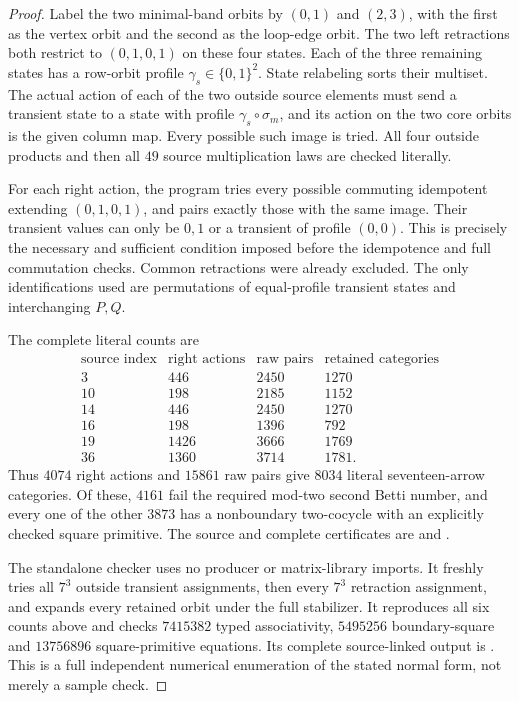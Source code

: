 \begin{proof}
Label the two minimal-band orbits by $(0,1)$ and $(2,3)$,
with the first as the vertex orbit and the second as the
loop-edge orbit.  The two left retractions both restrict
to $(0,1,0,1)$ on these four states.
Each of the three remaining states has a row-orbit
profile $\gamma_s\in\{0,1\}^2$.  State relabeling sorts
their multiset.  The actual action of each of the two
outside source elements must send a transient state to
a state with profile $\gamma_s\circ\sigma_m$, and its
action on the two core orbits is the given column map.
Every possible such image is tried.  All four outside
products and then all $49$ source multiplication laws
are checked literally.

For each right action, the program tries every possible
commuting idempotent extending $(0,1,0,1)$, and pairs
exactly those with the same image.  Their transient
values can only be $0,1$ or a transient of profile
$(0,0)$.  This is precisely the necessary and sufficient
condition imposed before the idempotence and full
commutation checks.  Common retractions were already
excluded.  The only identifications used are permutations
of equal-profile transient states and interchanging
$P,Q$.

The complete literal counts are
\[
\begin{array}{c|r|r|r}
\text{source index}&\text{right actions}&
   \text{raw pairs}&\text{retained categories}\\\hline
3&446&2450&1270\\
10&198&2185&1152\\
14&446&2450&1270\\
16&198&1396&792\\
19&1426&3666&1769\\
36&1360&3714&1781.
\end{array}
\]
Thus $4074$ right actions and $15861$ raw pairs give
$8034$ literal seventeen-arrow categories.  Of these,
$4161$ fail the required mod-two second Betti number,
and every one of the other $3873$ has a nonboundary
two-cocycle with an explicitly checked square primitive.
The source and complete certificates are
 and
.

The standalone checker
uses no producer or matrix-library imports.  It freshly
tries all $7^3$ outside transient assignments, then every
$7^3$ retraction assignment, and expands every retained
orbit under the full stabilizer.  It reproduces all
six counts above and checks $7415382$ typed associativity,
$5495256$ boundary-square and $13756896$ square-primitive
equations.  Its complete source-linked output is
.
This is a full independent numerical enumeration of the
stated normal form, not merely a sample check.
\end{proof}


